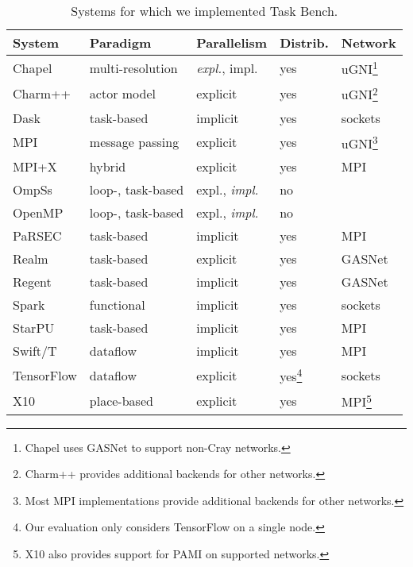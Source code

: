 \begin{table}[t]
\begin{tabular}{l | l | l | l | l}
System & Paradigm & Parallelism & Distrib. & Network \\
\hline
Chapel & multi-resolution & \emph{expl.}, impl. & yes & uGNI\footnote{Chapel uses GASNet to support non-Cray networks.} \\
Charm++ & actor model & explicit & yes & uGNI\footnote{Charm++ provides additional backends for other networks.} \\
Dask & task-based & implicit & yes & sockets \\
MPI & message passing & explicit & yes & uGNI\footnote{Most MPI implementations provide additional backends for other networks.} \\
MPI+X & hybrid & explicit & yes & MPI \\
OmpSs & loop-, task-based & expl., \emph{impl.} & no & \\
OpenMP & loop-, task-based & expl., \emph{impl.} & no & \\
PaRSEC & task-based & implicit & yes & MPI \\
Realm & task-based & explicit & yes & GASNet \\
Regent & task-based & implicit & yes & GASNet \\
Spark & functional & implicit & yes & sockets \\
StarPU & task-based & implicit & yes & MPI \\
Swift/T & dataflow & implicit & yes & MPI \\
TensorFlow & dataflow & explicit & yes\footnote{Our evaluation only considers TensorFlow on a single node.} & sockets \\
X10 & place-based & explicit & yes & MPI\footnote{X10 also provides support for PAMI on supported networks.}
\end{tabular}

\caption{Systems for which we implemented Task Bench.\label{tab:systems}}
\vspace{-0.5cm}
\end{table}
